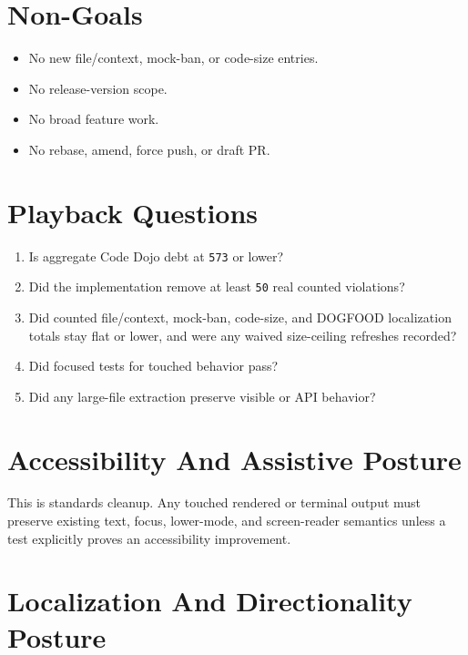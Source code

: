 \section{Non-Goals}\label{record-238-non-goals}

\begin{itemize}
\tightlist
\item
  No new file/context, mock-ban, or code-size entries.
\item
  No release-version scope.
\item
  No broad feature work.
\item
  No rebase, amend, force push, or draft PR.
\end{itemize}

\section{Playback Questions}\label{record-238-playback-questions}

\begin{enumerate}
\def\labelenumi{\arabic{enumi}.}
\tightlist
\item
  Is aggregate Code Dojo debt at \texttt{5\allowbreak{}7\allowbreak{}3} or lower?
\item
  Did the implementation remove at least \texttt{5\allowbreak{}0} real counted violations?
\item
  Did counted file/context, mock-ban, code-size, and DOGFOOD localization totals stay flat or lower, and were any waived size-ceiling refreshes recorded?
\item
  Did focused tests for touched behavior pass?
\item
  Did any large-file extraction preserve visible or API behavior?
\end{enumerate}

\section{Accessibility And Assistive Posture}\label{record-238-accessibility-and-assistive-posture}

This is standards cleanup. Any touched rendered or terminal output must preserve existing text, focus, lower-mode, and screen-reader semantics unless a test explicitly proves an accessibility improvement.

\section{Localization And Directionality Posture}\label{record-238-localization-and-directionality-posture}


